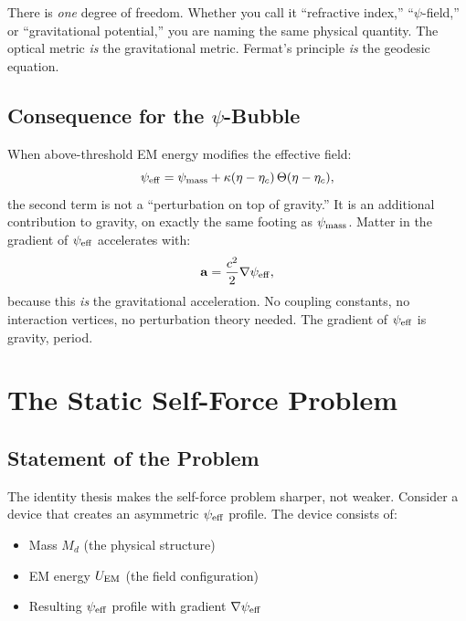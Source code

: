 \documentclass[11pt]{article}
\newcommand{\psieff}{\psi_{\rm eff}}
\newcommand{\etac}{\eta_c}
\newcommand{\avec}{\mathbf{a}}
\begin{document}
There is \emph{one} degree of freedom. Whether you call it ``refractive
index,'' ``$\psi$-field,'' or ``gravitational potential,'' you are naming
the same physical quantity. The optical metric \emph{is} the gravitational
metric. Fermat's principle \emph{is} the geodesic equation.

\subsection{Consequence for the $\psi$-Bubble}

When above-threshold EM energy modifies the effective field:
\begin{equation}\label{eq:psieff}
\psieff = \psi_{\rm mass} + \kappa(\eta - \etac)\,\Theta(\eta - \etac),
\end{equation}
the second term is not a ``perturbation on top of gravity.'' It is an
additional contribution to gravity, on exactly the same footing as
$\psi_{\rm mass}$. Matter in the gradient of $\psieff$ accelerates with:
\begin{equation}
\avec = \frac{c^2}{2}\nabla\psieff,
\end{equation}
because this \emph{is} the gravitational acceleration. No coupling
constants, no interaction vertices, no perturbation theory needed. The
gradient of $\psieff$ is gravity, period.

\section{The Static Self-Force Problem}\label{sec:self-force}

\subsection{Statement of the Problem}

The identity thesis makes the self-force problem sharper, not weaker.
Consider a device that creates an asymmetric $\psieff$ profile. The device
consists of:
\begin{itemize}
\item Mass $M_d$ (the physical structure)
\item EM energy $U_{\rm EM}$ (the field configuration)
\item Resulting $\psieff$ profile with gradient $\nabla\psieff$
\end{itemize}
\end{document}
